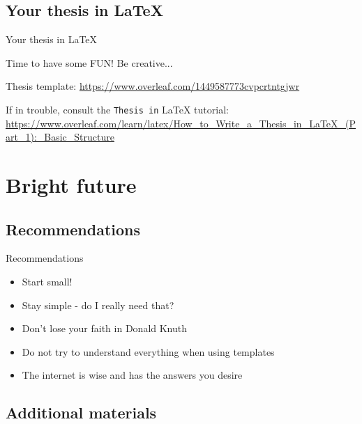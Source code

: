 \documentclass[inputenc]{beamer}
\begin{document}
\subsection{Your thesis in \LaTeX{}}

\begin{frame}{Your thesis in \LaTeX{}}
    
    Time to have some FUN! Be creative...
    
    \vspace{1cm}
    Thesis template:
    \url{https://www.overleaf.com/1449587773cvpcrtntgjwr}
    
    \vspace{1cm}
    If in trouble, consult the \texttt{Thesis in} \LaTeX{} tutorial: 
    \url{https://www.overleaf.com/learn/latex/How_to_Write\_a\_Thesis\_in\_LaTeX\_(Part\_1):\_Basic\_Structure}
    
\end{frame}

\section{Bright future}

\subsection{Recommendations}

\begin{frame}{Recommendations}

    \begin{itemize}
        \item Start small!
        \item Stay simple - do I really need that?
        \item Don't lose your faith in Donald Knuth
        \item Do not try to understand everything when using templates
        \item The internet is wise and has the answers you desire
    \end{itemize}
    
\end{frame}

\subsection{Additional materials}
\end{document}
